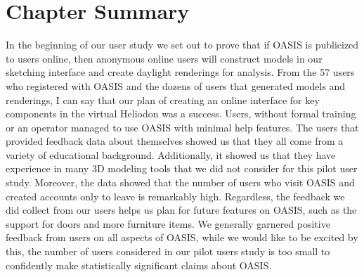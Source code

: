 \section{Chapter Summary}

In the beginning of our user study we set out to prove that if OASIS is publicized to users online, then anonymous online users will construct models in our sketching interface and create daylight renderings for analysis.
From the 57  users who registered with OASIS and the dozens of users that generated models and renderings, I can say that our plan of creating an online interface for key components in the virtual Heliodon was a success.
Users, without formal training or an operator managed to use OASIS with minimal help features.
The users that provided feedback data about themselves showed us that they all come from a variety of educational background. 
Additionally, it showed us that they have experience in many 3D modeling tools that we did not consider for this pilot user study.
Moreover, the data showed that the number of users who visit OASIS and created accounts only to leave is remarkably high.
Regardless, the feedback we did collect from our users helps us plan for future features on OASIS, such as the support for doors and more furniture items. 
We generally garnered positive feedback from users on all aspects of OASIS, while we would like to be excited by this, the number of users considered in our pilot users study is too small to confidently make statistically significant claims about OASIS. 



























